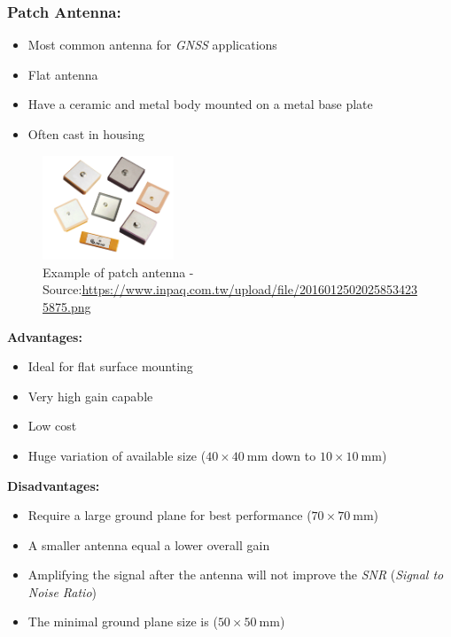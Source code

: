\documentclass[report.tex]{subfiles}
\begin{document}
\subsubsection{Patch Antenna:}
\begin{itemize}
\item Most common antenna for \textit{GNSS} applications
\item Flat antenna
\item Have a ceramic and metal body mounted on a metal base plate
\item Often cast in housing
\end{itemize}

\begin{figure}[H]
	\centering
	\includegraphics[width=0.35\textwidth]{Include/Figure/antenna/patch_antenna_1.png}
	\caption{Example of patch antenna - Source:\url{https://www.inpaq.com.tw/upload/file/20160125020258534235875.png}}
	\label{fig:patch_antenna_1}
\end{figure}

\begin{flushleft}
\textbf{Advantages:}
\end{flushleft}
\begin{itemize}
\item Ideal for flat surface mounting
\item Very high gain capable
\item Low cost
\item Huge variation of available size ($40\times \SI{40}{\milli\meter}$ down to $10\times \SI{10}{\milli\meter}$)
\end{itemize}

\begin{flushleft}
\textbf{Disadvantages:}
\end{flushleft}
\begin{itemize}
\item Require a large ground plane for best performance ($70\times \SI{70}{\milli\meter}$)
\item A smaller antenna equal a lower overall gain
\item Amplifying the signal after the antenna will not improve the \textit{SNR} (\textit{Signal to Noise Ratio})
\item The minimal ground plane size is ($50\times \SI{50}{\milli\meter}$)
\end{itemize}
\end{document}
